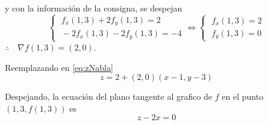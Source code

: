 \begin{solution}
    y con la información de la consigna, se despejan
    \[\begin{cases}
            \;f_x(1,3) + 2f_y(1,3)=2 \\[5pt]
            \;-2f_x(1,3)- 2f_y(1,3)=-4
        \end{cases}
        \iff
        \begin{cases}
            \;f_x(1,3)=2 \\[5pt]
            \;f_y(1,3)=0
        \end{cases}
    \]
    $\therefore\quad\nabla f(1,3)=(2,0)$.

       Reemplazando en \eqref{eq:zNabla}
      \[
        z= 2 + (2,0)(x-1,y-3)
    \]


        Despejando, la ecuación del plano tangente al grafico de $f$ en el punto $(1,3,f(1,3))$ es
          \[
         z -2x = 0
    \]
 
\newpage
\end{solution}

